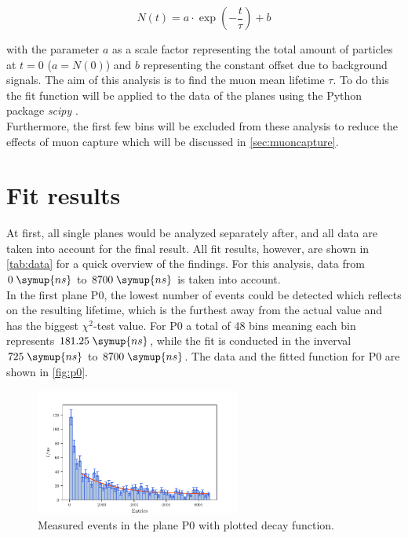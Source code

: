 \begin{equation}
    N(t) = a \cdot \exp\left(- \frac{t}{\tau}\right) + b 
    \label{eqn:fit}
\end{equation}

with the parameter $a$ as a scale factor representing the total amount of particles at $t=0$ ($ a = N(0)$)
and $b$ representing the constant offset due to background signals. The aim of this analysis is to 
find the muon mean lifetime $\tau$. To do this the fit function will be applied to the data of the planes 
using the Python package \textit{scipy} \cite{scipy}.\\
Furthermore, the first few bins will be excluded from these analysis to reduce the effects of muon capture 
which will be discussed in \autoref{sec:muoncapture}.

\section{Fit results}

At first, all single planes would be analyzed separately after, and all data are taken into account for the final result. All fit results, however, are shown in 
\autoref{tab:data} for a quick overview of the findings. For this analysis, data from $0 \; \symup{ns}$ to $8700 \; \symup{ns}$ is taken into account.\\
In the first plane P0, the lowest number of events could be detected which reflects on the resulting lifetime, which is the furthest away from the actual value and has the biggest $\chi^2$-test value.
For P0 a total of 48 bins meaning each bin represents $181.25 \; \symup{ns}$, while the fit is conducted in the inverval $725 \; \symup{ns}$ to $8700 \; \symup{ns}$.
The data and the fitted function for P0 are shown in \autoref{fig:p0}.\\
\begin{figure}
    \centering
    \includegraphics[width=0.6\textwidth]{plots/p0.pdf}
    \caption{Measured events in the plane P0 with plotted decay function.}
    \label{fig:p0}
\end{figure}

